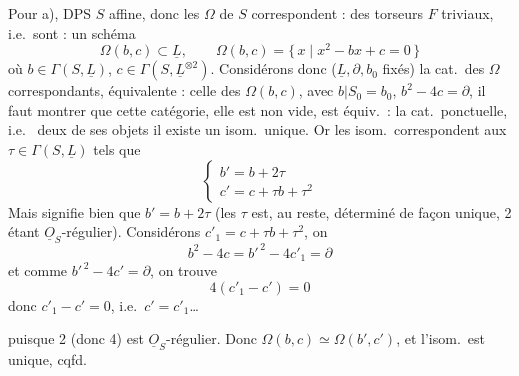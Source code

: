 \documentclass[11pt,a4paper]{article}
\begin{document}

Pour a), DPS $S$ affine, donc les $\Omega$  
de $S$ correspondent : des \struck{\ill{}} torseurs $F$ triviaux, i.e.\ sont : un schéma
\[
\Omega(b, c) \subset \underline{L}, \qquad \Omega(b, c) = \{\, x \mid x^2 - bx + c = 0 \,\}
\]
où $b \in \Gamma(S, \underline{L})$, $c \in \Gamma(S, \underline{L}^{\otimes 2})$. Considérons donc
($\underline{L}, \partial, b_0$ fixés) la cat.\ des $\Omega$ correspondants,
\struck{\ill{}} équivalente : celle des $\Omega(b, c)$, avec
$b|S_0 = b_0$, $b^2 - 4c = \partial$, il faut montrer que cette
catégorie,  elle est non vide, est équiv.\ : la cat.\
ponctuelle, i.e.\ \struck{\ill{}}  deux de ses objets il existe un
\add{entre $\Omega(b, c)$ et $\Omega(b', c')$}
isom.\ unique. Or les  isom.\ correspondent
aux $\tau \in \Gamma(S, \underline{L})$ tels que
\[
\begin{cases}
b' = b + 2\tau \\
c' = c + \tau b + \tau^2
\end{cases}
\]
Mais   signifie bien que
$b' = b + 2\tau$ (les $\tau$ est, au reste, déterminé de façon
unique, 2 étant $\underline{O}_S$-régulier). 
\struck{\ill{}}
Considérons $c'_1 = c + \tau b + \tau^2$, on \struck{\ill{}} 
\[
b^2 - 4c = b'^{\,2} - 4c'_1 = \partial
\]
et comme $b'^{\,2} - 4c' = \partial$, on trouve
\[
4(c'_1 - c') = 0
\]
donc $c'_1 - c' = 0$, i.e.\ $c' = c'_1$\ldots

puisque 2 \struck{\ill{}} (donc 4) est $\underline{O}_S$-régulier.
Donc $\Omega(b, c) \simeq \Omega(b', c')$, et l'isom.\ est unique, cqfd.
\end{document}

